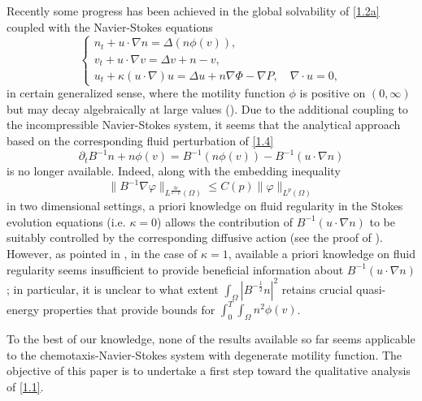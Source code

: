 \documentclass[12pt]{article}
\theoremstyle{plain}
\theoremstyle{definition}
\numberwithin{equation}{section}
\begin{document}
 Recently some  progress has been achieved in the global solvability of  \eqref{1.2a} coupled with the Navier-Stokes equations
   \begin{equation}\label{1.5}
\begin{cases}
n_t+u\cdot\nabla n=\Delta (n\phi(v)),\\
v_t+u\cdot\nabla v=\Delta v+n-v,\\
u_t+ \kappa (u\cdot\nabla) u=\Delta u+n\nabla\Phi-\nabla P, \quad\nabla\cdot u=0,
\end{cases}
\end{equation}
in certain generalized sense, where the motility function $\phi$ is positive on $(0,\infty)$ but may decay algebraically at
large values (\cite{Tian,WinklerADE}).
 Due to the additional coupling to
the incompressible Navier-Stokes system, it seems that
 the analytical approach based on the corresponding
fluid perturbation of \eqref{1.4}
\begin{equation}\label{1.6}
\partial_t B^{-1}n+ n\phi (v)= B^{-1}( n\phi (v))-  B^{-1}(u\cdot\nabla n)
\end{equation}
is  no longer available.  Indeed, along with  the embedding inequality
$$\|B^{-1} \nabla \varphi
\|_
{
L^{\frac{2p}{2-p}}(\Omega)
}\leq C(p)\|\varphi\|_
{
L^{p}(\Omega)
}$$
in two dimensional  settings,
a priori knowledge on fluid regularity in the Stokes evolution equations (i.e. $\kappa=0$) allows the
contribution of $ B^{-1}(u\cdot\nabla n)$ to be suitably controlled by the corresponding  diffusive action
(see the proof of \cite [Lemma 4.3] {Tian}). However, as pointed in \cite{Winklerpreprint,WinklerADE}, in the case of $\kappa=1$,
available
a priori knowledge on fluid regularity seems insufficient to provide beneficial information about
 $ B^{-1}(u\cdot\nabla n)$; in particular, it is unclear to what extent
 $ \int_\Omega |B^{-\frac 12} n|^2 $
 retains crucial quasi-energy properties that
   provide bounds for $ \int^T_0\int_{\Omega} n^2 \phi(v)$.

 To the best of our knowledge, none of the results available so far seems applicable to
the chemotaxis-Navier-Stokes system with  degenerate motility function.
 The objective of this paper is to undertake a first step toward the qualitative analysis of \eqref{1.1}.
\end{document}
